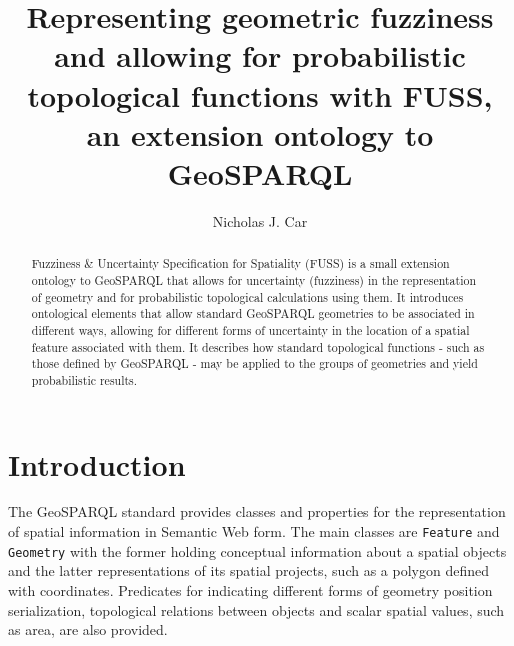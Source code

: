 \documentclass[runningheads]{llncs}
\begin{document}
\title{Representing geometric fuzziness and allowing for probabilistic topological functions with FUSS, an extension ontology to GeoSPARQL}

\author{
    Nicholas J. Car
}



\maketitle

\begin{abstract}
Fuzziness \& Uncertainty Specification for Spatiality (FUSS) is a small extension ontology to GeoSPARQL that allows for uncertainty (fuzziness)  in the representation of geometry and for probabilistic topological calculations using them. It introduces ontological elements that allow standard GeoSPARQL geometries to be associated in different ways, allowing for different forms of uncertainty in the location of a spatial feature associated with them. It describes how standard topological functions - such as those defined by GeoSPARQL - may be applied to the groups of geometries and yield probabilistic results. 

\end{abstract}


\section{Introduction}\label{sec:introduction}
The GeoSPARQL standard \cite{nicholas_j_car_ogc_2023} provides classes and properties for the representation of spatial information in Semantic Web \cite{BernersLee2001TheSW} form. The main classes are \texttt{Feature} and \texttt{Geometry} with the former holding conceptual information about a spatial objects and the latter representations of its spatial projects, such as a polygon defined with coordinates. Predicates for indicating different forms of  geometry position serialization, topological relations between objects and scalar spatial values, such as area, are also provided. 
\end{document}
